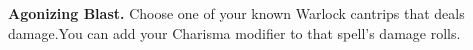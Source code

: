 \textbf{Agonizing Blast.} Choose one of your known Warlock cantrips that deals damage.\fmark You can add your Charisma modifier to that spell's damage rolls.

